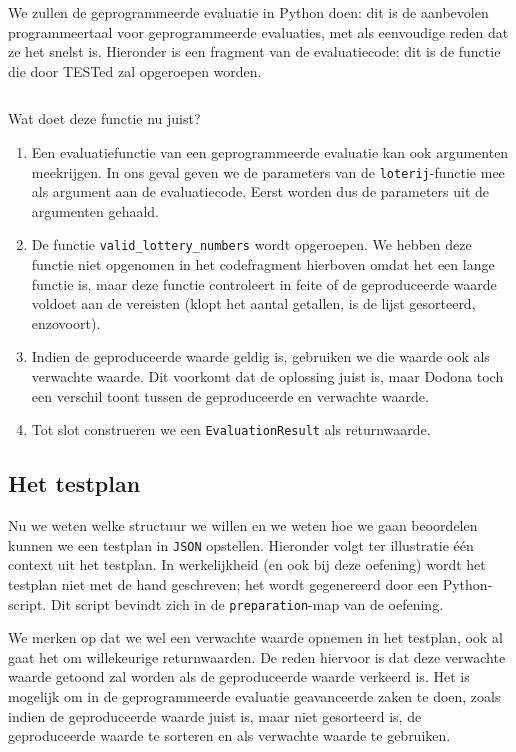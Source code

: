 We zullen de geprogrammeerde evaluatie in Python doen: dit is de aanbevolen programmeertaal voor geprogrammeerde evaluaties, met als eenvoudige reden dat ze het snelst is.
Hieronder is een fragment van de evaluatiecode: dit is de functie die door TESTed zal opgeroepen worden.

\inputminted[firstline=42,lastline=49]{python}{sources/lotto-evaluator.py}

Wat doet deze functie nu juist?

\begin{enumerate}
    \item Een evaluatiefunctie van een geprogrammeerde evaluatie kan ook argumenten meekrijgen.
    In ons geval geven we de parameters van de \texttt{loterij}-functie mee als argument aan de evaluatiecode.
    Eerst worden dus de parameters uit de argumenten gehaald.
    \item De functie \texttt{valid\_lottery\_numbers} wordt opgeroepen.
    We hebben deze functie niet opgenomen in het codefragment hierboven omdat het een lange functie is, maar deze functie controleert in feite of de geproduceerde waarde voldoet aan de vereisten (klopt het aantal getallen, is de lijst gesorteerd, enzovoort).
    \item Indien de geproduceerde waarde geldig is, gebruiken we die waarde ook als verwachte waarde.
    Dit voorkomt dat de oplossing juist is, maar Dodona toch een verschil toont tussen de geproduceerde en verwachte waarde.
    \item Tot slot construeren we een \texttt{EvaluationResult} als returnwaarde.
\end{enumerate}

\subsection{Het testplan}\label{subsec:oefening-lotto-testplan}

Nu we weten welke structuur we willen en we weten hoe we gaan beoordelen kunnen we een testplan in \texttt{JSON} opstellen.
Hieronder volgt ter illustratie één context uit het testplan.
In werkelijkheid (en ook bij deze oefening) wordt het testplan niet met de hand geschreven;
het wordt gegenereerd door een Python-script.
Dit script bevindt zich in de \texttt{preparation}-map van de oefening.

We merken op dat we wel een verwachte waarde opnemen in het testplan, ook al gaat het om willekeurige returnwaarden.
De reden hiervoor is dat deze verwachte waarde getoond zal worden als de geproduceerde waarde verkeerd is.
Het is mogelijk om in de geprogrammeerde evaluatie geavanceerde zaken te doen, zoals indien de geproduceerde waarde juist is, maar niet gesorteerd is, de geproduceerde waarde te sorteren en als verwachte waarde te gebruiken.

